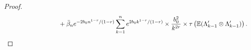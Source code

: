 \begin{proof}
\begin{align}
&\hspace{3cm}+ \bar \beta_n e^{-2 b_0 n^{1-r}/(1-r)} \sum_{k=1}^n e^{2 b_0 k^{1-r}/(1-r)}  \times \frac{b_0^2}{k^{2 r}}  \times \tau\left(\E (\Lambda_{k-1}' \otimes \Lambda_{k-1}')\right).
\end{align} 
%

\end{proof}
